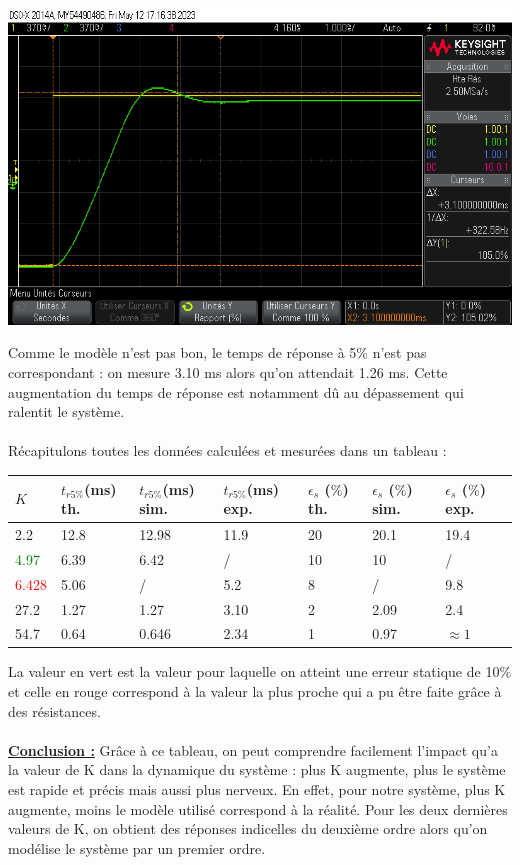 \documentclass[12pt]{article}
\begin{document}
\begin{center}
    \includegraphics[width = 16 cm]{TP3/Syst_1/P/k27_2_tr.png}
\end{center}
Comme le modèle n'est pas bon, le temps de réponse à 5$\%$ n'est pas correspondant : on mesure 3.10 ms alors qu'on attendait 1.26 ms. Cette augmentation du temps de réponse est notamment dû au dépassement qui ralentit le système.
\\\\Récapitulons toutes les données calculées et mesurées dans un tableau : 

\begin{center}
    \begin{tabular}{ |p{1cm}|p{2.5cm}|p{2.5cm}|p{2.5cm}|p{2.5cm}|p{2.5cm}|p{2.5 cm}|}

        \hline
        $K$ & \normalsize  $t_{r5\%}$(ms) th. & $t_{r5\%}$(ms) sim. & $t_{r5\%}$(ms) exp.& $\epsilon_s$ ($\%$) th. & $\epsilon_s$ ($\%$) sim. & $\epsilon_s$ ($\%$) exp.\\
        \hline
        2.2& 12.8 & 12.98 & 11.9 &20 & 20.1 & 19.4\\
        \textcolor{green}{4.97} & 6.39 & 6.42 & / & 10 & 10 & / \\
        \textcolor{red}{6.428} & 5.06 & / &5.2 & 8 & / &9.8 \\
        27.2 & 1.27 & 1.27 & 3.10 &2 & 2.09 & 2.4\\
        54.7 & 0.64 & 0.646 & 2.34 &1 & 0.97 & $\approx 1$\\
        \hline
        \end{tabular}
    \end{center}
La valeur en vert est la valeur pour laquelle on atteint une erreur statique de 10$\%$ et celle en rouge correspond à la valeur la plus proche qui a pu être faite grâce à des résistances.
\\\\\underline{\bf Conclusion :} Grâce à ce tableau, on peut comprendre facilement l'impact qu'a la valeur de K dans la dynamique du système : plus K augmente, plus le système est rapide et précis mais aussi plus nerveux. En effet, pour notre système, plus K augmente, moins le modèle utilisé correspond à la réalité. Pour les deux dernières valeurs de K, on obtient des réponses indicelles du deuxième ordre alors qu'on modélise le système par un premier ordre.
\end{document}
